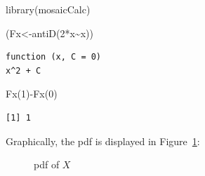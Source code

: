 \documentclass[
  letterpaper,
  DIV=11,
  numbers=noendperiod]{scrreprt}
\newenvironment{Shaded}{\begin{snugshade}}{\end{snugshade}}
\newcommand{\DecValTok}[1]{\textcolor[rgb]{0.68,0.00,0.00}{#1}}
\newcommand{\FunctionTok}[1]{\textcolor[rgb]{0.28,0.35,0.67}{#1}}
\newcommand{\NormalTok}[1]{\textcolor[rgb]{0.00,0.23,0.31}{#1}}
\newcommand{\OtherTok}[1]{\textcolor[rgb]{0.00,0.23,0.31}{#1}}
\newcommand{\SpecialCharTok}[1]{\textcolor[rgb]{0.37,0.37,0.37}{#1}}
\begin{document}
\begin{Shaded}
\begin{Highlighting}[]
\FunctionTok{library}\NormalTok{(mosaicCalc)}
\end{Highlighting}
\end{Shaded}

\begin{Shaded}
\begin{Highlighting}[]
\NormalTok{(Fx}\OtherTok{\textless{}{-}}\FunctionTok{antiD}\NormalTok{(}\DecValTok{2}\SpecialCharTok{*}\NormalTok{x}\SpecialCharTok{\textasciitilde{}}\NormalTok{x))}
\end{Highlighting}
\end{Shaded}

\begin{verbatim}
function (x, C = 0) 
x^2 + C
\end{verbatim}

\begin{Shaded}
\begin{Highlighting}[]
\FunctionTok{Fx}\NormalTok{(}\DecValTok{1}\NormalTok{)}\SpecialCharTok{{-}}\FunctionTok{Fx}\NormalTok{(}\DecValTok{0}\NormalTok{)}
\end{Highlighting}
\end{Shaded}

\begin{verbatim}
[1] 1
\end{verbatim}

Graphically, the pdf is displayed in Figure~\ref{fig-plot111}:

\begin{figure}


\caption{\label{fig-plot111}pdf of \(X\)}

\end{figure}%
\end{document}

